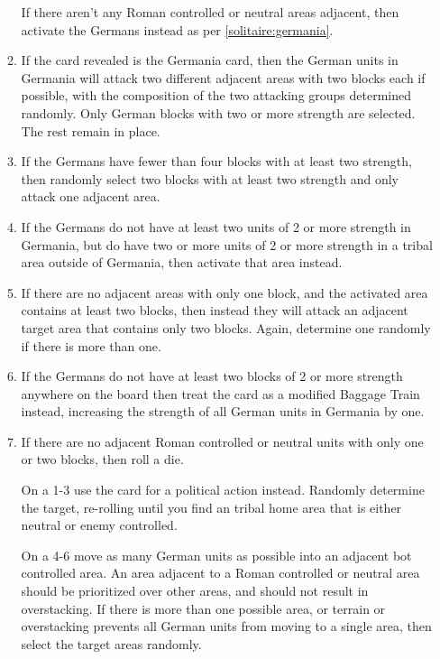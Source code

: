 \begin{enumerate}
\begin{enumerate}[leftmargin=0in]
    If there aren't any Roman controlled or neutral areas adjacent, then activate the Germans instead as per \ref{solitaire:germania}.

    \item \label{solitaire:germania}If the card revealed is the Germania card, then the German units in Germania will attack two different adjacent areas with two blocks each if possible, with the composition of the two attacking groups determined randomly. Only German blocks with two or more strength are selected. The rest remain in place.

    \item If the Germans have fewer than four blocks with at least two strength, then randomly select two blocks with at least two strength and only attack one adjacent area.
    
    \item If the Germans do not have at least two units of 2 or more strength in Germania, but do have two or more units of 2 or more strength in a tribal area outside of Germania, then activate that area instead.

    \item If there are no adjacent areas with only one block, and the activated area contains at least two blocks, then instead they will attack an adjacent target area that contains only two blocks. Again, determine one randomly if there is more than one.
    
    \item If the Germans do not have at least two blocks of 2 or more strength anywhere on the board then treat the card as a modified Baggage Train instead, increasing the strength of all German units in Germania by one.

    \item If there are no adjacent Roman controlled or neutral units with only one or two blocks, then roll a die.
    
    On a 1-3 use the card for a political action instead. Randomly determine the target, re-rolling until you find an tribal home area that is either neutral or enemy controlled.
    
    On a 4-6 move as many German units as possible into an adjacent bot controlled area. An area adjacent to a Roman controlled or neutral area should be prioritized over other areas, and should not result in overstacking. If there is more than one possible area, or terrain or overstacking prevents all German units from moving to a single area, then select the target areas randomly.
    

\end{enumerate}
\end{enumerate}
